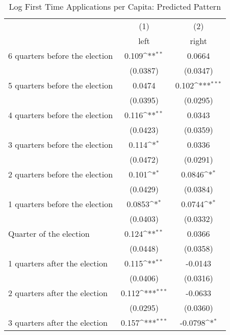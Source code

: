 \begin{table}[htbp]\centering
\def\sym#1{\ifmmode^{#1}\else\(^{#1}\)\fi}
\caption{Log First Time Applications per Capita: Predicted Pattern}
\begin{tabular}{l*{2}{c}}
\hline\hline
                    &\multicolumn{1}{c}{(1)}&\multicolumn{1}{c}{(2)}\\
                    &\multicolumn{1}{c}{left}&\multicolumn{1}{c}{right}\\
\hline
 6 quarters before the election&       0.109\sym{**} &      0.0664         \\
                    &    (0.0387)         &    (0.0347)         \\
[1em]
 5 quarters before the election&      0.0474         &       0.102\sym{***}\\
                    &    (0.0395)         &    (0.0295)         \\
[1em]
 4 quarters before the election&       0.116\sym{**} &      0.0343         \\
                    &    (0.0423)         &    (0.0359)         \\
[1em]
 3 quarters before the election&       0.114\sym{*}  &      0.0336         \\
                    &    (0.0472)         &    (0.0291)         \\
[1em]
 2 quarters before the election&       0.101\sym{*}  &      0.0846\sym{*}  \\
                    &    (0.0429)         &    (0.0384)         \\
[1em]
 1 quarters before the election&      0.0853\sym{*}  &      0.0744\sym{*}  \\
                    &    (0.0403)         &    (0.0332)         \\
[1em]
Quarter of the election&       0.124\sym{**} &      0.0366         \\
                    &    (0.0448)         &    (0.0358)         \\
[1em]
 1 quarters after the election&       0.115\sym{**} &     -0.0143         \\
                    &    (0.0406)         &    (0.0316)         \\
[1em]
 2 quarters after the election&       0.112\sym{***}&     -0.0633         \\
                    &    (0.0295)         &    (0.0360)         \\
[1em]
 3 quarters after the election&       0.157\sym{***}&     -0.0798\sym{*}  \\

\end{tabular}
\end{table}
